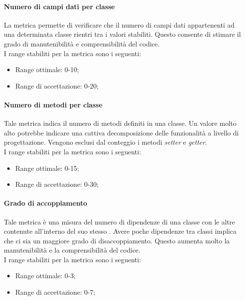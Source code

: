 			\paragraph[Numero di campi dati per classe]{\hypertarget{ncdc}{Numero di campi dati per classe}}
			La metrica permette di verificare che il numero di campi dati appartenenti ad una determinata classe rientri tra i valori stabiliti. Questo consente di stimare il grado di manutenibilità e comprensibilità del codice.
			\\I range stabiliti per la metrica sono i seguenti:
			\begin{itemize}
				\item Range ottimale: 0-10;
				\item Range di accettazione: 0-20;
			\end{itemize}
			
			\paragraph[Numero di metodi per classe]{\hypertarget{nmc}{Numero di metodi per classe}}
			Tale metrica indica il numero di metodi definiti in una classe. Un valore molto alto potrebbe indicare una cattiva decomposizione delle funzionalità a livello di progettazione. Vengono esclusi dal conteggio i metodi \textit{setter} e \textit{getter}.
			\\I range stabiliti per la metrica sono i seguenti:
			\begin{itemize}
				\item Range ottimale: 0-15;
				\item Range di accettazione: 0-30;
			\end{itemize}
			
			\paragraph[Grado di accoppiamento]{\hypertarget{ga}{Grado di accoppiamento}}
			Tale metrica è una misura del numero di dipendenze di una classe con le altre contenute all'interno del suo stesso . Avere poche dipendenze tra classi implica che ci sia un maggiore grado di disaccoppiamento. Questo aumenta molto la manutenibilità e la comprensibilità del codice.
			\\I range stabiliti per la metrica sono i seguenti:
			\begin{itemize}
				\item Range ottimale: 0-3;
				\item Range di accettazione: 0-7;
			\end{itemize}
			
